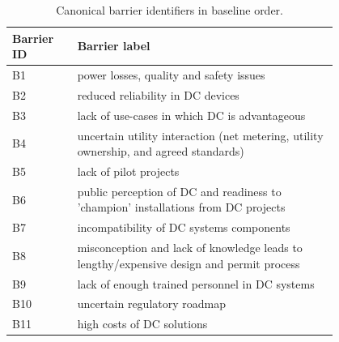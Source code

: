 \begin{table}[htbp]
\centering
\small
\caption{Canonical barrier identifiers in baseline order.}
\label{tab:barrier-dictionary}
\begin{tabular}{lp{0.80\linewidth}}
\hline
Barrier ID & Barrier label \\
\hline
B1 & power losses, quality and safety issues \\
B2 & reduced reliability in DC devices \\
B3 & lack of use-cases in which DC is advantageous \\
B4 & uncertain utility interaction (net metering, utility ownership, and agreed standards) \\
B5 & lack of pilot projects \\
B6 & public perception of DC and readiness to 'champion' installations from DC projects \\
B7 & incompatibility of DC systems components \\
B8 & misconception and lack of knowledge leads to lengthy/expensive design and permit process \\
B9 & lack of enough trained personnel in DC systems \\
B10 & uncertain regulatory roadmap \\
B11 & high costs of DC solutions \\
\hline
\end{tabular}
\end{table}
